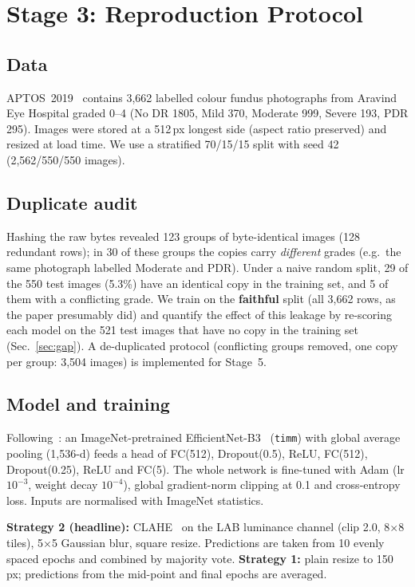\section{Stage 3: Reproduction Protocol}
\label{sec:protocol}

\subsection{Data}
APTOS~2019~\cite{aptos2019} contains 3{,}662 labelled colour fundus photographs from Aravind Eye Hospital
graded 0--4 (No DR 1805, Mild 370, Moderate 999, Severe 193, PDR 295). Images were stored at a 512\,px longest
side (aspect ratio preserved) and resized at load time. We use a stratified 70/15/15 split with seed 42
(2{,}562/550/550 images).

\subsection{Duplicate audit}
\label{sec:dups}
Hashing the raw bytes revealed 123 groups of byte-identical images (128 redundant rows); in 30 of these groups
the copies carry \emph{different} grades (e.g.\ the same photograph labelled Moderate and PDR). Under a naive
random split, 29 of the 550 test images (5.3\%) have an identical copy in the training set, and 5 of them with
a conflicting grade. We train on the \textbf{faithful} split (all 3{,}662 rows, as the paper presumably did)
and quantify the effect of this leakage by re-scoring each model on the 521 test images that have no copy in
the training set (Sec.~\ref{sec:gap}). A de-duplicated protocol (conflicting groups removed, one copy per
group: 3{,}504 images) is implemented for Stage~5.

\subsection{Model and training}
Following~\cite{chilukoti2024}: an ImageNet-pretrained EfficientNet-B3~\cite{tan2019efficientnet}
(\texttt{timm}) with global average pooling (1{,}536-d) feeds a head of FC(512), Dropout(0.5), ReLU,
FC(512), Dropout(0.25), ReLU and FC(5). The whole network is
fine-tuned with Adam (lr $10^{-3}$, weight decay $10^{-4}$), global gradient-norm clipping at 0.1 and
cross-entropy loss. Inputs are normalised with ImageNet statistics.

\textbf{Strategy 2 (headline):} CLAHE~\cite{zuiderveld1994clahe} on the LAB luminance channel (clip 2.0,
8$\times$8 tiles), 5$\times$5 Gaussian blur, square resize. Predictions are taken from 10 evenly spaced epochs
and combined by majority vote. \textbf{Strategy 1:} plain resize to 150\,px; predictions from the mid-point
and final epochs are averaged.

